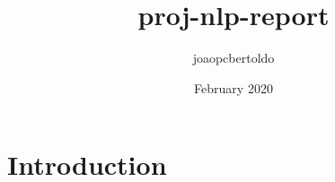\documentclass{article}
\title{proj-nlp-report}
\author{joaopcbertoldo }
\date{February 2020}
\begin{document}
\maketitle

\section{Introduction}
\end{document}
